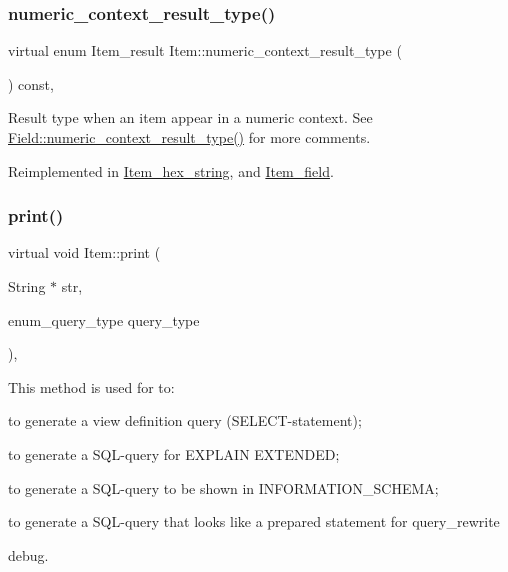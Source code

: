 \subsubsection{\texorpdfstring{numeric\+\_\+context\+\_\+result\+\_\+type()}{numeric\_context\_result\_type()}}
{\footnotesize\ttfamily virtual enum Item\+\_\+result Item\+::numeric\+\_\+context\+\_\+result\+\_\+type (\begin{DoxyParamCaption}{ }\end{DoxyParamCaption}) const\hspace{0.3cm}{\ttfamily [inline]}, {\ttfamily [virtual]}}

Result type when an item appear in a numeric context. See \mbox{\hyperlink{classField_a834475c74f6d0812dc4aa1abfc483a7f}{Field\+::numeric\+\_\+context\+\_\+result\+\_\+type()}} for more comments. 

Reimplemented in \mbox{\hyperlink{classItem__hex__string_af866816dabea5ef3d8316a2055ebab84}{Item\+\_\+hex\+\_\+string}}, and \mbox{\hyperlink{classItem__field_aa456671bbffd7f807a25b1a76bd3ea54}{Item\+\_\+field}}.

\mbox{\label{classItem_aa7ba4bde739d83adec8edf3bf1596d94}} 
\subsubsection{\texorpdfstring{print()}{print()}}
{\footnotesize\ttfamily virtual void Item\+::print (\begin{DoxyParamCaption}\item[{String $\ast$}]{str,  }\item[{enum\+\_\+query\+\_\+type}]{query\+\_\+type }\end{DoxyParamCaption})\hspace{0.3cm}{\ttfamily [inline]}, {\ttfamily [virtual]}}

This method is used for to\+:
\begin{DoxyItemize}
\item to generate a view definition query (S\+E\+L\+E\+CT-\/statement);
\item to generate a S\+QL-\/query for E\+X\+P\+L\+A\+IN E\+X\+T\+E\+N\+D\+ED;
\item to generate a S\+QL-\/query to be shown in I\+N\+F\+O\+R\+M\+A\+T\+I\+O\+N\+\_\+\+S\+C\+H\+E\+MA;
\item to generate a S\+QL-\/query that looks like a prepared statement for query\+\_\+rewrite
\item debug.
\end{DoxyItemize}

